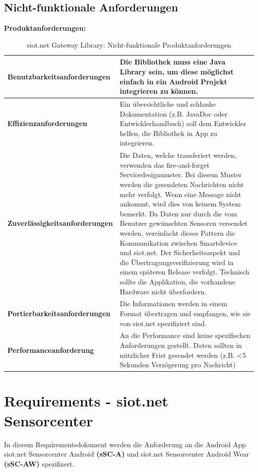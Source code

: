 \subsection{Nicht-funktionale Anforderungen}
\textbf{Produktanforderungen:}
\begin{table}[H]
\centering
\begin{tabular}{|>{\columncolor[gray]{0.8}}p{5cm}|p{11.5cm}|}
\hline
\textbf{Benutzbarkeitsanforderungen}    & Die Bibliothek muss eine Java Library sein, um diese möglichst einfach in ein Android Projekt integrieren zu können. \\ \hline
\textbf{Effizienzanforderungen}         & Ein übersichtliche und schlanke Dokumentation (z.B. JavaDoc oder Entwicklerhandbuch) soll dem Entwickler helfen, die Bibliothek in App zu integrieren. \\ \hline
\textbf{Zuverlässigkeitsanforderungen}  & Die Daten, welche transferiert werden, verwenden das fire-and-forget Servicedesignmuster. Bei diesem Muster werden die gesendeten Nachrichten nicht mehr verfolgt. Wenn eine Message nicht ankommt, wird dies von keinem System bemerkt. Da Daten nur durch die vom Benutzer gewünschten Sensoren versendet werden, vereinfacht dieses Pattern die Kommunikation zwischen Smartdevice und siot.net. Der Sicherheitsaspekt und die Übertragungsverifizierung wird in einem späteren Release verfolgt. Technisch sollte die Applikation, die vorhandene Hardware nicht überfordern. \\ \hline
\textbf{Portierbarkeitsanforderungen}   & Die Informationen werden in einem Format übertragen und empfangen, wie sie von siot.net spezifiziert sind. \\ \hline
\textbf{Performanceanforderung}         & An die Performance sind keine spezifischen Anforderungen gestellt. Daten sollten in nützlicher Frist gesendet werden {(z.B. <5 Sekunden Verzögerung pro Nachricht)} \\ \hline
\end{tabular}
\caption{siot.net Gateway Library: Nicht-funktionale Produktanforderungen}
\end{table}

\newpage

\section{Requirements - siot.net Sensorcenter}
In diesem Requirementsdokument werden die Anforderung an die Android App siot.net Sensorcenter Android \textbf{(\gls{sSC-A})} und siot.net Sensorcenter Android Wear \textbf{(\gls{sSC-AW})} spezifizert.

